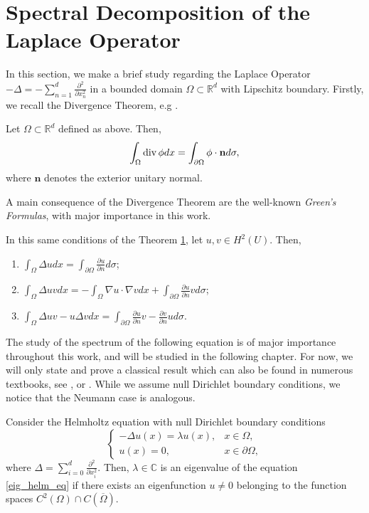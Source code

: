 \section{Spectral Decomposition of the Laplace Operator}\label{div_theo}
In this section, we make a brief study regarding the Laplace Operator \(-\Delta = -\sum_{n=1}^{d} \frac{\partial^2}{\partial x_n^2}\) in a bounded domain \(\Omega \subset \mathbb{R}^d\) with Lipschitz boundary. Firstly, we recall the Divergence Theorem, e.g \cite{evans2015measure}.
\begin{theorem}
    Let \(\Omega \subset \mathbb{R}^d\) defined as above. Then,
    \[
      \int_\Omega \operatorname{div} \phi dx = \int_{\partial\Omega} \phi \cdot \mathbf{n} d\sigma,
    \]
    where \(\mathbf{n}\) denotes the exterior unitary normal.
\end{theorem}
A main consequence of the Divergence Theorem are the well-known \textit{Green's Formulas}, with major importance in this work.
\begin{corollary}
    In this same conditions of the Theorem \ref{div_theo}, let \(u, v \in H^2(U)\). Then,
    \begin{enumerate}
        \item \(\int_\Omega \Delta u dx = \int_{\partial \Omega} \frac{\partial u}{\partial n} d\sigma\);
        \item \(\int_\Omega \Delta u v dx = -\int_\Omega \nabla u \cdot \nabla v dx + \int_{\partial \Omega} \frac{\partial u}{\partial n}v d\sigma\);
        \item \(\int_\Omega \Delta u v - u \Delta v dx= \int_{\partial \Omega} \frac{\partial u}{\partial n}v - \frac{\partial v}{\partial n}u d\sigma\).
    \end{enumerate}
\end{corollary}

The study of the spectrum of the following equation is of major importance throughout this work, and will be studied in the following chapter. For now, we will only state and prove a classical result which can also be found in numerous textbooks, see \cite{brezis2011functional} \cite{arendt2010partielle}, \cite{courant2008methods} or \cite{borthwick2020spectral}. While we assume null Dirichlet boundary conditions, we notice that the Neumann case is analogous.

\begin{definition}\label{eig_def}
    Consider the Helmholtz equation with null Dirichlet boundary conditions
    \begin{equation}\label{eig_helm_eq}
        \begin{cases}
            -\Delta u(x) = \lambda u(x), & x \in \Omega, \\
            u(x) = 0, & x \in \partial \Omega,
        \end{cases}
    \end{equation}
    where $\Delta=\sum_{i=0}^{d}\frac{\partial^2 }{\partial x_i^2}$. Then, \(\lambda \in \mathbb{C}\) is an eigenvalue of the equation \eqref{eig_helm_eq} if there exists an eigenfunction \(u \neq 0\) belonging to the function spaces \(C^2(\Omega) \cap C(\overline{\Omega})\).
\end{definition}

